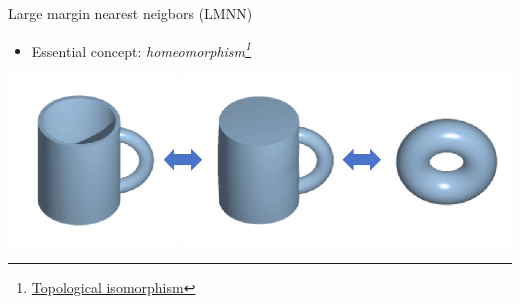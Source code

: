 \documentclass[11pt]{beamer}
\newcommand{\uniitem}[1]{\begin{itemize}\item #1 \end{itemize}}
\newcommand{\ftref}[2]{{\color{blue}\footnotesize \href{#1}{#2}}}
\begin{document}
\begin{frame}{Large margin nearest neigbors (LMNN)}
	\uniitem{Essential concept: \emph{homeomorphism\footnote[frame]{\ftref{https://en.wikipedia.org/wiki/Homeomorphism\#:\~:text=In\%20mathematics\%20and\%20more\%20specifically,has\%20a\%20continuous\%20inverse\%20function.}{Topological isomorphism}}}}
	\centering
	\includegraphics[scale=0.8]{homeomorphism.jpg}
\end{frame}
\end{document}
